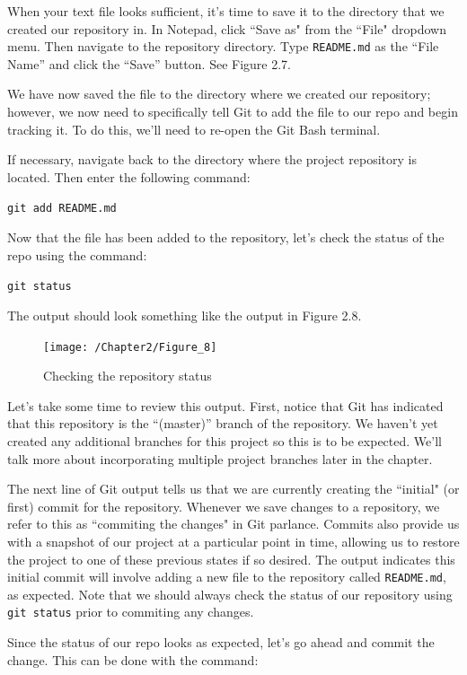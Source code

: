 \documentclass{book}
\begin{document}
When your text file looks sufficient, it's time to save it to the directory that we created our repository in. In Notepad, click ``Save as" from the ``File" dropdown menu. Then navigate to the repository directory. Type \texttt{README.md} as the ``File Name'' and click the ``Save'' button. See Figure 2.7.

We have now saved the file to the directory where we created our repository; however, we now need to specifically tell Git to add the file to our repo and begin tracking it. To do this, we'll need to re-open the Git Bash terminal. 

If necessary, navigate back to the directory where the project repository is located. Then enter the following command:

\texttt{git add README.md}

Now that the file has been added to the repository, let's check the status of the repo using the command:

\texttt{git status}

The output should look something like the output in Figure 2.8. 

\begin{figure}[h]
	\caption{Checking the repository status}
	\centering\texttt{[image: /Chapter2/Figure\_8]}
\end{figure}

Let's take some time to review this output. First, notice that Git has indicated that this repository is the ``(master)'' branch of the repository. We haven't yet created any additional branches for this project so this is to be expected. We'll talk more about incorporating multiple project branches later in the chapter.

The next line of Git output tells us that we are currently creating the ``initial" (or first)  commit for the repository. Whenever we save changes to a repository, we refer to this as ``commiting the changes" in Git parlance. Commits also provide us with a snapshot of our project at a particular point in time, allowing us to restore the project to one of these previous states if so desired. The output indicates this initial commit will involve adding a new file to the repository called \texttt{README.md}, as expected. Note that we should always check the status of our repository using \texttt{git status} prior to commiting any changes.

Since the status of our repo looks as expected, let's go ahead and commit the change. This can be done with the command:
\end{document}
